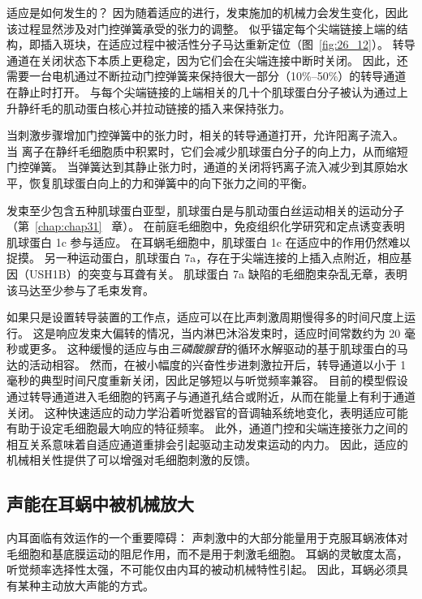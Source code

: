 适应是如何发生的？
因为随着适应的进行，发束施加的机械力会发生变化，因此该过程显然涉及对门控弹簧承受的张力的调整。
似乎锚定每个尖端链接上端的结构，即插入斑块，在适应过程中被活性分子马达重新定位（图~\ref{fig:26_12}）。
转导通道在关闭状态下本质上更稳定，因为它们会在尖端连接中断时关闭。
因此，还需要一台电机通过不断拉动门控弹簧来保持很大一部分（10\%–50\%）的转导通道在静止时打开。
与每个尖端链接的上端相关的几十个肌球蛋白分子被认为通过上升静纤毛的肌动蛋白核心并拉动链接的插入来保持张力。


当刺激步骤增加门控弹簧中的张力时，相关的转导通道打开，允许阳离子流入。
当  离子在静纤毛细胞质中积累时，它们会减少肌球蛋白分子的向上力，从而缩短门控弹簧。
当弹簧达到其静止张力时，通道的关闭将钙离子流入减少到其原始水平，恢复肌球蛋白向上的力和弹簧中的向下张力之间的平衡。


发束至少包含五种肌球蛋白亚型，肌球蛋白是与肌动蛋白丝运动相关的运动分子（第~\ref{chap:chap31}~ 章）。
在前庭毛细胞中，免疫组织化学研究和定点诱变表明肌球蛋白 1c 参与适应。
在耳蜗毛细胞中，肌球蛋白 1c 在适应中的作用仍然难以捉摸。
另一种运动蛋白，肌球蛋白 7a，存在于尖端连接的上插入点附近，相应基因（USH1B）的突变与耳聋有关。
肌球蛋白 7a 缺陷的毛细胞束杂乱无章，表明该马达至少参与了毛束发育。


如果只是设置转导装置的工作点，适应可以在比声刺激周期慢得多的时间尺度上运行。
这是响应发束大偏转的情况，当内淋巴沐浴发束时，适应时间常数约为 20 毫秒或更多。
这种缓慢的适应与由\textit{三磷酸腺苷}的循环水解驱动的基于肌球蛋白的马达的活动相容。
然而，在被小幅度的兴奋性步进刺激拉开后，转导通道以小于 1 毫秒的典型时间尺度重新关闭，因此足够短以与听觉频率兼容。
目前的模型假设通过转导通道进入毛细胞的钙离子与通道孔结合或附近，从而在能量上有利于通道关闭。
这种快速适应的动力学沿着听觉器官的音调轴系统地变化，表明适应可能有助于设定毛细胞最大响应的特征频率。
此外，通道门控和尖端连接张力之间的相互关系意味着自适应通道重排会引起驱动主动发束运动的内力。
因此，适应的机械相关性提供了可以增强对毛细胞刺激的反馈。


\subsection{声能在耳蜗中被机械放大}

内耳面临有效运作的一个重要障碍：
声刺激中的大部分能量用于克服耳蜗液体对毛细胞和基底膜运动的阻尼作用，而不是用于刺激毛细胞。
耳蜗的灵敏度太高，听觉频率选择性太强，不可能仅由内耳的被动机械特性引起。
因此，耳蜗必须具有某种主动放大声能的方式。


